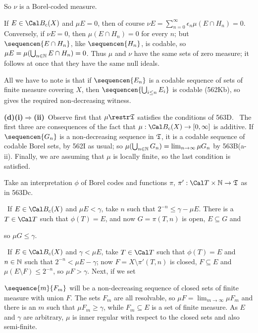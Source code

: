 {\noindent So $\nu$ is a Borel-coded measure.

If $E\in\Cal B_c(X)$ and $\mu E=0$, then of course
$\nu E=\sum_{n=0}^{\infty}\epsilon_n\mu(E\cap H_n)=0$.   Conversely, if
$\nu E=0$, then $\mu(E\cap H_n)=0$ for every $n$;  but
$\sequencen{E\cap H_n}$, like $\sequencen{H_n}$, is codable, so
$\mu E=\mu(\bigcup_{n\in\Bbb N}E\cap H_n)=0$.   Thus $\mu$ and $\nu$ have
the same sets of zero measure;  it follows at once that they have the
same null ideals.

\medskip

 All we have to note is that if $\sequencen{E_n}$ is
a codable sequence of sets of finite measure covering $X$, then
$\sequencen{\bigcup_{i\le n}E_i}$ is codable (562Kb), so gives the
required non-decreasing witness.

\medskip

{\bf (d)}{\bf (i)$\Rightarrow$(ii)}\grheada\  Observe first that
$\mu\restr\frak T$ satisfies the conditions of 563D.
\Prf\ The first three are consequences of the fact that
$\mu:\Cal B_c(X)\to[0,\infty]$ is additive.   If $\sequencen{G_n}$ is a
non-decreasing sequence in $\frak T$, it is a codable sequence of codable
Borel sets, by 562I as usual;  so
$\mu(\bigcup_{n\in\Bbb N}G_n)=\lim_{n\to\infty}\mu G_n$ by 563B(a-ii).
Finally, we are assuming that $\mu$ is locally finite, so the last
condition is satisfied.\ \Qed

Take an interpretation $\phi$ of Borel codes and
functions $\pi$, $\pi':\Cal T\times\Bbb N\to\frak T$ as in 563Dc.

\medskip

\quad\grheadb\ If $E\in\Cal B_c(X)$ and
$\mu E<\gamma$, take $n$ such that
$2^{-n}\le\gamma-\mu E$.   There is a $T\in\Cal T$ such that
$\phi(T)=E$, and now $G=\pi(T,n)$ is
open, $E\subseteq G$ and


\noindent so $\mu G\le\gamma$.

\medskip

\quad\grheadc\ If $E\in\Cal B_c(X)$ and $\gamma<\mu E$, take $T\in\Cal T$
such that $\phi(T)=E$ and $n\in\Bbb N$ such that $2^{-n}<\mu E-\gamma$;
now $F=X\setminus\pi'(T,n)$ is closed, $F\subseteq E$ and
$\mu(E\setminus F)\le 2^{-n}$, so $\mu F>\gamma$.   Next, if we set


\noindent $\sequence{m}{F_m}$ will be a non-decreasing sequence of closed
sets of finite measure with union $F$.   The sets $F_m$ are all resolvable,
so $\mu F=\lim_{m\to\infty}\mu F_m$ and there is an $m$ such that
$\mu F_m\ge\gamma$, while $F_m\subseteq E$ is a set of finite
measure.   As $E$ and $\gamma$ are arbitrary, $\mu$ is inner regular with
respect to the closed sets and also semi-finite.

}
